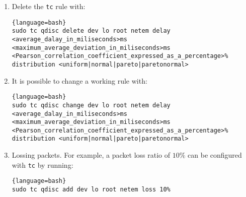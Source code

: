 \begin{enumerate}
  Example:

  \begin{enumerate}
  \item Add the following rule:
    
    \begin{lstlisting}{language=bash}
sudo tc qdisc add dev lo root netem delay 100ms 10ms 25% distribution normal
    \end{lstlisting}
    
  \item Check that the rule has been installed with the command:
    
    \begin{lstlisting}{language=bash}
tc qdisc show dev lo
    \end{lstlisting}
    
    that should output (or something very similar): ``\texttt{ qdisc
      netem 8009: root refcnt 2 limit 1000 delay 100ms 10ms 25\%}''
  \end{enumerate}

\item Delete the \verb|tc| rule with:
  
  \begin{lstlisting}{language=bash}
sudo tc qdisc delete dev lo root netem delay <average_dalay_in_miliseconds>ms <maximum_average_deviation_in_miliseconds>ms <Pearson_correlation_coefficient_expressed_as_a_percentage>% distribution <uniform|normal|pareto|paretonormal>
  \end{lstlisting}

\item It is possible to change a working rule with:

  \begin{lstlisting}{language=bash}
sudo tc qdisc change dev lo root netem delay <average_dalay_in_miliseconds>ms <maximum_average_deviation_in_miliseconds>ms <Pearson_correlation_coefficient_expressed_as_a_percentage>% distribution <uniform|normal|pareto|paretonormal>
\end{lstlisting}

\item Lossing packets. For example, a packet
loss ratio of $10\%$ can be configured with \verb|tc| by running:

  \begin{lstlisting}{language=bash}
sudo tc qdisc add dev lo root netem loss 10%
  \end{lstlisting}
  
\end{enumerate}


